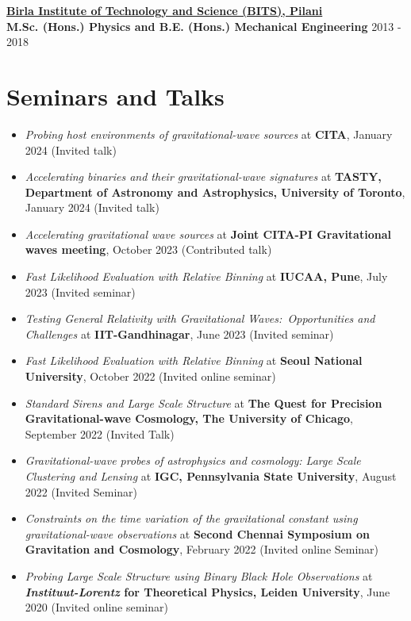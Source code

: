 \documentclass[11pt, margin, centered, letterpaper]{res}
\begin{document}
\begin{resume}
		\textbf{\href{http://www.bits-pilani.ac.in/}{Birla Institute of Technology and Science (BITS), Pilani}}\\
		\textbf{M.Sc. (Hons.) Physics and B.E. (Hons.) Mechanical Engineering} \hfill 2013 - 2018
		
		\section{Seminars and Talks}
		\begin{itemize}[leftmargin=*]
			\item \textit{Probing host environments of gravitational-wave sources} at \textbf{CITA}, January 2024 (Invited talk)
			\item \textit{Accelerating binaries and their gravitational-wave signatures} at \textbf{TASTY, Department of Astronomy and Astrophysics, University of Toronto}, January 2024 (Invited talk)
			\item \textit{Accelerating gravitational wave sources} at \textbf{Joint CITA-PI Gravitational waves meeting}, October 2023 (Contributed talk)
			\item \textit{Fast Likelihood Evaluation with Relative Binning} at\textbf{ IUCAA, Pune}, July 2023 (Invited seminar)
			\item \textit{Testing General Relativity with Gravitational Waves:\ Opportunities and Challenges} at \textbf{IIT-Gandhinagar}, June 2023 (Invited seminar)
			\item \textit{Fast Likelihood Evaluation with Relative Binning} at \textbf{Seoul National University}, October 2022 (Invited online seminar)
			\item \textit{Standard Sirens and Large Scale Structure} at \textbf{The Quest for Precision Gravitational-wave Cosmology, The University of Chicago}, September 2022 (Invited Talk)    \item \textit{Gravitational-wave probes of astrophysics and cosmology: Large Scale Clustering and Lensing} at \textbf{IGC, Pennsylvania State University}, August 2022 (Invited Seminar)
			\item \textit{Constraints on the time variation of the gravitational constant using gravitational-wave observations} at \textbf{Second Chennai Symposium on Gravitation and Cosmology}, February 2022 (Invited online Seminar)
			\item \textit{Probing Large Scale Structure using Binary Black Hole Observations} at \textbf{\textit{Instituut-Lorentz} for Theoretical Physics, Leiden University}, June 2020 (Invited online seminar)

\end{itemize}
\end{resume}
\end{document}
